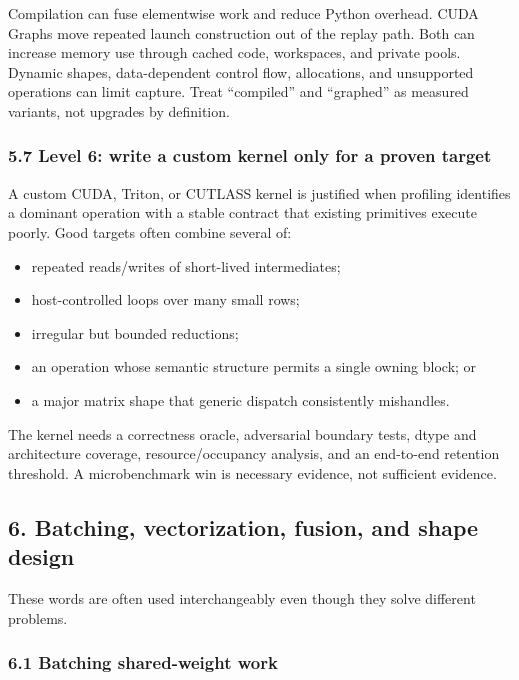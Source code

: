 \documentclass[
  10pt,
  letterpaper,
]{article}
\providecommand{\tightlist}{%
  \setlength{\itemsep}{0pt}\setlength{\parskip}{0pt}}
\begin{document}
Compilation can fuse elementwise work and reduce Python overhead. CUDA
Graphs move repeated launch construction out of the replay path. Both
can increase memory use through cached code, workspaces, and private
pools. Dynamic shapes, data-dependent control flow, allocations, and
unsupported operations can limit capture. Treat ``compiled'' and
``graphed'' as measured variants, not upgrades by definition.

\subsubsection{5.7 Level 6: write a custom kernel only for a proven
target}\label{57-level-6-write-a-custom-kernel-only-for-a-proven-target}

A custom CUDA, Triton, or CUTLASS kernel is justified when profiling
identifies a dominant operation with a stable contract that existing
primitives execute poorly. Good targets often combine several of:

\begin{itemize}
\tightlist
\item
  repeated reads/writes of short-lived intermediates;
\item
  host-controlled loops over many small rows;
\item
  irregular but bounded reductions;
\item
  an operation whose semantic structure permits a single owning block;
  or
\item
  a major matrix shape that generic dispatch consistently mishandles.
\end{itemize}

The kernel needs a correctness oracle, adversarial boundary tests, dtype
and architecture coverage, resource/occupancy analysis, and an
end-to-end retention threshold. A microbenchmark win is necessary
evidence, not sufficient evidence.

\subsection{6. Batching, vectorization, fusion, and shape
design}\label{6-batching-vectorization-fusion-and-shape-design}

These words are often used interchangeably even though they solve
different problems.

\subsubsection{6.1 Batching shared-weight
work}\label{61-batching-shared-weight-work}
\end{document}
